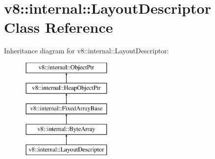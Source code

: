 \hypertarget{classv8_1_1internal_1_1LayoutDescriptor}{}\section{v8\+:\+:internal\+:\+:Layout\+Descriptor Class Reference}
\label{classv8_1_1internal_1_1LayoutDescriptor}
Inheritance diagram for v8\+:\+:internal\+:\+:Layout\+Descriptor\+:\begin{figure}[H]
\begin{center}
\leavevmode
\includegraphics[height=5.000000cm]{classv8_1_1internal_1_1LayoutDescriptor}
\end{center}
\end{figure}
